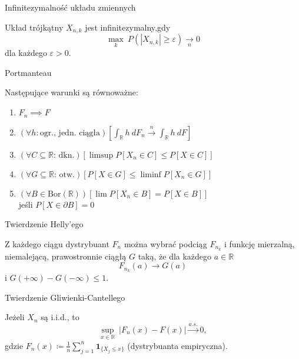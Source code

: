 \documentclass[avery5371,grid,frame]{flashcards}
\begin{document}
\begin{flashcard}[Definicja]{Infinitezymalność układu zmiennych}

\smallskip
Układ trójkątny $X_{n, k}$ jest infinitezymalny,gdy
$$\max_k \ P(|X_{n, k}| \geq \varepsilon) \xrightarrow[n]{} 0$$ dla każdego $\varepsilon > 0$.
\end{flashcard}

\begin{flashcard}[Twierdzenie]{Portmanteau}

Następujące warunki są równoważne:
\begin{enumerate}
\item $F_n \implies F$
\item $\left( \forall h: \text{ogr., jedn. ciągła} \right) \left[ \int_\mathbb{R} h \ dF_n \xrightarrow{n} \int_\mathbb{R} h \ dF \right]$
\item $\left( \forall C \subseteq \mathbb{R} \text{: dkn.} \right) \left[\limsup P[X_n \in C] \leq P[X \in C] \right]$
\item $\left( \forall G \subseteq \mathbb{R} \text{: otw.} \right) \left[ P[X \in G] \leq \liminf P[X_n \in G] \right]$
\item $\left( \forall B \in \text{Bor}(\mathbb{R})\right) \left[ \lim P[X_n \in B] = P[X \in B] \right]$ \\ jeśli $P[X \in \partial B] = 0$
\end{enumerate}
\end{flashcard}

\begin{flashcard}[Twierdzenie]{Twierdzenie Helly'ego}

\smallskip
Z każdego ciągu dystrybuant $F_n$ można wybrać podciąg $F_{n_k}$  i funkcję mierzalną, niemalejącą, prawostronnie ciągłą $G$ taką, że dla każdego $a \in \mathbb{R}$ $$F_{n_k}(a) \rightarrow G(a)$$ i $G(+ \infty) - G(- \infty) \leq 1$.
\end{flashcard}

\begin{flashcard}[Twierdzenie]{Twierdzenie Gliwienki-Cantellego}

\smallskip
Jeżeli $X_n$ są i.i.d., to $$\sup\limits_{x \in \mathbb{R}} \ |F_n(x) - F(x)| \xrightarrow{a.s.} 0,$$ gdzie $F_n(x) \coloneqq \frac{1}{n} \sum_{j=1}^n \textbf{1}_{\{X_j \leq x\}}$ (dystrybuanta empiryczna).
\end{flashcard}
\end{document}
